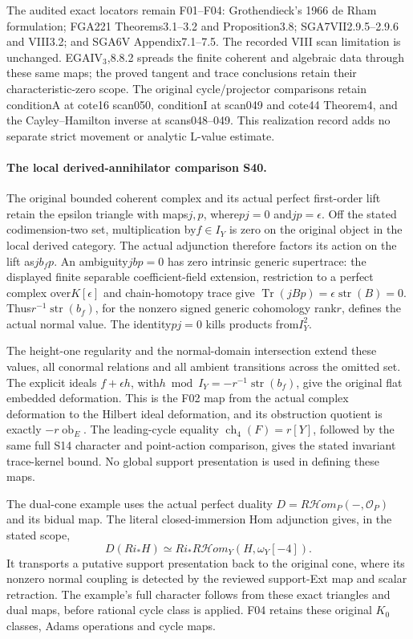The audited exact locators remain F01--F04: Grothendieck's
1966 de Rham formulation; FGA221 Theorems3.1--3.2 and
Proposition3.8; SGA7VII2.9.5--2.9.6 and VIII3.2; and
SGA6V Appendix7.1--7.5. The recorded VIII scan limitation
is unchanged. EGAIV$_3$,8.8.2 spreads the finite coherent
and algebraic data through these same maps; the proved
tangent and trace conclusions retain their characteristic-zero
scope. The original cycle/projector comparisons retain
conditionA at cote16 scan050, conditionI at scan049 and
cote44 Theorem4, and the Cayley--Hamilton inverse at
scans048--049. This realization record adds no separate
strict movement or analytic L-value estimate.


\paragraph{The local derived-annihilator comparison S40.}
The original bounded coherent complex and its actual perfect
first-order lift retain the epsilon triangle with maps$j,p$,
where$pj=0$ and$jp=\epsilon$. Off the stated codimension-two
set, multiplication by$f\in I_Y$ is zero on the original
object in the local derived category. The actual adjunction
therefore factors its action on the lift as$j b_f p$.
An ambiguity$j b p=0$ has zero intrinsic generic supertrace:
the displayed finite separable coefficient-field extension,
restriction to a perfect complex over$K[\epsilon]$ and
chain-homotopy trace give
$\operatorname{Tr}(jBp)=\epsilon\operatorname{str}(B)=0$.
Thus$r^{-1}\operatorname{str}(b_f)$, for the nonzero signed
generic cohomology rank$r$, defines the actual normal value.
The identity$pj=0$ kills products from$I_Y^2$.

The height-one regularity and the normal-domain intersection
extend these values, all conormal relations and all ambient
transitions across the omitted set. The explicit ideals
$f+\epsilon h$, with$h\bmod I_Y=-r^{-1}\operatorname{str}(b_f)$,
give the original flat embedded deformation. This is the
F02 map from the actual complex deformation to the Hilbert
ideal deformation, and its obstruction quotient is exactly
$-r\operatorname{ob}_E$. The leading-cycle equality
$\operatorname{ch}_4(F)=r[Y]$, followed by the same full
S14 character and point-action comparison, gives the
stated invariant trace-kernel bound. No global support
presentation is used in defining these maps.

The dual-cone example uses the actual perfect duality
$D=R\mathcal Hom_P(-,\mathcal O_P)$ and its bidual map.
The literal closed-immersion Hom adjunction gives, in the stated scope,
\[
 D(Ri_*H)\simeq Ri_*R\mathcal Hom_Y(H,\omega_Y[-4]).
\]
It transports a putative support presentation back to the
original cone, where its nonzero normal coupling is
detected by the reviewed support-Ext map and scalar
retraction. The example's full character follows from
these exact triangles and dual maps, before rational
cycle class is applied. F04 retains these original
$K_0$ classes, Adams operations and cycle maps.

